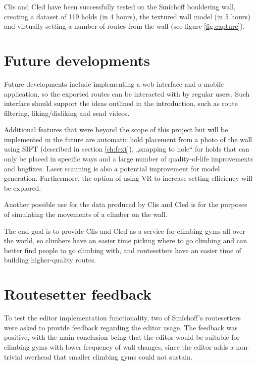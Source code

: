 \label{sec:conclusion}
Clis and Cled have been successfully tested on the Smíchoff bouldering wall, creating a dataset of 119 holds (in 4 hours), the textured wall model (in 5 hours) and virtually setting a number of routes from the wall (see figure \ref{fig:capture}).

\setcounter{secnumdepth}{0}

\section{Future developments}
Future developments include implementing a web interface and a mobile application, so the exported routes can be interacted with by regular users.
Such interface should support the ideas outlined in the introduction, such as route filtering, liking/disliking and send videos.

Additional features that were beyond the scope of this project but will be implemented in the future are automatic hold placement from a photo of the wall using SIFT (described in section \ref{ch:fext}), „snapping to hole“ for holds that can only be placed in specific ways and a large number of quality-of-life improvements and bugfixes.
Laser scanning is also a potential improvement for model generation.
Furthermore, the option of using VR to increase setting efficiency will be explored.

Another possible use for the data produced by Clis and Cled is for the purposes of simulating the movements of a climber on the wall.

The end goal is to provide Clis and Cled as a service for climbing gyms all over the world, so climbers have an easier time picking where to go climbing and can better find people to go climbing with, and routesetters have an easier time of building higher-quality routes.

\section{Routesetter feedback}
To test the editor implementation functionality, two of Smíchoff's routesetters were asked to provide feedback regarding the editor usage.
The feedback was positive, with the main conclusion being that the editor would be suitable for climbing gyms with lower frequency of wall changes, since the editor adds a non-trivial overhead that smaller climbing gyms could not sustain.

\setcounter{secnumdepth}{3}
